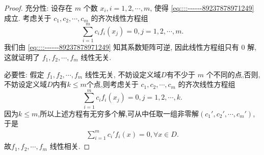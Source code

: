 \documentclass[../../main.tex]{subfiles}
\begin{document}
\begin{proof}
充分性: 设存在 \( m \) 个数 \( x_i, i = 1, 2, \cdots, m \), 使得 \eqref{eq::::------89237878971249} 成立. 考虑关于 \( c_1, c_2, \cdots, c_m \) 的齐次线性方程组
\[
\sum_{i=1}^m c_i f_i(x_j) = 0, j = 1, 2, \cdots, m.
\]
我们由 \eqref{eq::::------89237878971249} 知其系数矩阵可逆, 因此线性方程组只有 0 解, 这就证明了 \( f_1, f_2, \cdots, f_m \) 线性无关.

必要性: 假定 \( f_1, f_2, \cdots, f_m \) 线性无关, 不妨设定义域$D$有不少于 \( m \) 个不同的点,否则,不妨设定义域$D$内有$k\leqslant m$个点,则考虑关于 \( c_1, c_2, \cdots, c_m \) 的齐次线性方程组
\[
\sum_{i=1}^m c_i f_i(x_j) = 0, j = 1, 2, \cdots, k.
\]
因为$k\leqslant m$,所以上述方程有无穷多个解,可从中任取一组非零解$(c_1',c_2',\cdots,c_m')$,于是
\begin{align*}
\sum_{i=1}^m c_i' f_i(x) = 0, \forall x \in D.
\end{align*}
故\( f_1, f_2, \cdots, f_m \) 线性相关.


\end{proof}
\end{document}
